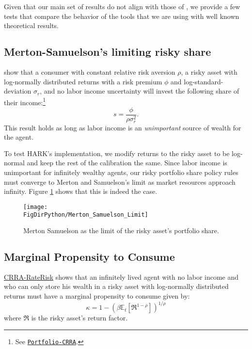 \documentclass[../CGMPort.tex]{subfiles}
\begin{document}
Given that our main set of results do not align with those of \cite{cgm2015},
we provide a few tests that compare the behavior of the tools that we are using with well known theoretical results.

\subsection{Merton-Samuelson's limiting risky share}

\cite{merton,samuelson} show that a consumer with constant relative
risk aversion $\rho$, a risky asset with log-normally distributed returns
with a risk premium $\phi$ and log-standard-deviation $\sigma_r$, and no labor income uncertainty will invest the following share of their income:\footnote{See 
\href{http://www.econ2.jhu.edu/people/ccarroll/public/lecturenotes/AssetPricing/Portfolio-CRRA/}{\texttt{Portfolio-CRRA}}.}
\begin{equation}
	s = \frac{\phi}{\rho \sigma^2_r}.
\end{equation}
This result holds as long as labor income is an \emph{unimportant} source of
wealth for the agent.

To test HARK's implementation, we modify returns to the risky asset to be 
log-normal and keep the rest of the calibration the same. Since labor income
is unimportant for infinitely wealthy agents, our risky portfolio share policy rules must converge to Merton and Samuelson's limit as market resources approach infinity. Figure \ref{fig:MS_share_limit} shows that this is indeed the case.

\begin{figure}[h]
	\texttt{[image: \\FigDirPython/Merton\_Samuelson\_Limit]}
	\caption{Merton Samuelson as the limit of the risky asset's portfolio 
		share.}\label{fig:MS_share_limit}
\end{figure}

\subsection{Marginal Propensity to Consume}

\href{http://www.econ2.jhu.edu/people/ccarroll/public/LectureNotes/Consumption/CRRA-RateRisk/}{CRRA-RateRisk}
shows that an infinitely lived agent with no labor income and who can only 
store his wealth in a risky asset with log-normally distributed
returns must have a marginal propensity to consume given by:
\begin{equation}\label{eq:mpc_limit}
	\kappa = 1 - \left( \beta \mathbb{E}_t \left[ \mathfrak{R}^{1-\rho} \right] 
	\right)	^{1/\rho}
\end{equation}
where $\mathfrak{R}$ is the risky asset's return factor.
\end{document}
